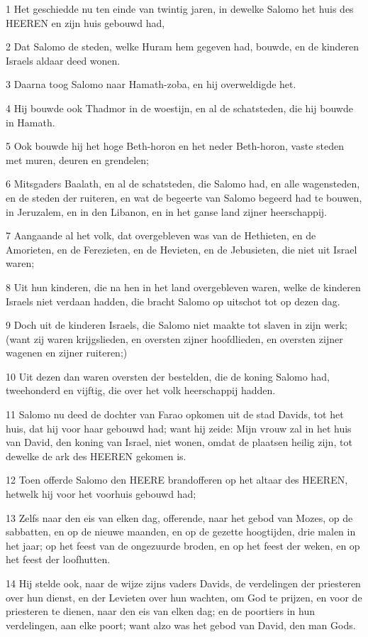 \par 1 Het geschiedde nu ten einde van twintig jaren, in dewelke Salomo het huis des HEEREN en zijn huis gebouwd had,
\par 2 Dat Salomo de steden, welke Huram hem gegeven had, bouwde, en de kinderen Israels aldaar deed wonen.
\par 3 Daarna toog Salomo naar Hamath-zoba, en hij overweldigde het.
\par 4 Hij bouwde ook Thadmor in de woestijn, en al de schatsteden, die hij bouwde in Hamath.
\par 5 Ook bouwde hij het hoge Beth-horon en het neder Beth-horon, vaste steden met muren, deuren en grendelen;
\par 6 Mitsgaders Baalath, en al de schatsteden, die Salomo had, en alle wagensteden, en de steden der ruiteren, en wat de begeerte van Salomo begeerd had te bouwen, in Jeruzalem, en in den Libanon, en in het ganse land zijner heerschappij.
\par 7 Aangaande al het volk, dat overgebleven was van de Hethieten, en de Amorieten, en de Ferezieten, en de Hevieten, en de Jebusieten, die niet uit Israel waren;
\par 8 Uit hun kinderen, die na hen in het land overgebleven waren, welke de kinderen Israels niet verdaan hadden, die bracht Salomo op uitschot tot op dezen dag.
\par 9 Doch uit de kinderen Israels, die Salomo niet maakte tot slaven in zijn werk; (want zij waren krijgslieden, en oversten zijner hoofdlieden, en oversten zijner wagenen en zijner ruiteren;)
\par 10 Uit dezen dan waren oversten der bestelden, die de koning Salomo had, tweehonderd en vijftig, die over het volk heerschappij hadden.
\par 11 Salomo nu deed de dochter van Farao opkomen uit de stad Davids, tot het huis, dat hij voor haar gebouwd had; want hij zeide: Mijn vrouw zal in het huis van David, den koning van Israel, niet wonen, omdat de plaatsen heilig zijn, tot dewelke de ark des HEEREN gekomen is.
\par 12 Toen offerde Salomo den HEERE brandofferen op het altaar des HEEREN, hetwelk hij voor het voorhuis gebouwd had;
\par 13 Zelfs naar den eis van elken dag, offerende, naar het gebod van Mozes, op de sabbatten, en op de nieuwe maanden, en op de gezette hoogtijden, drie malen in het jaar; op het feest van de ongezuurde broden, en op het feest der weken, en op het feest der loofhutten.
\par 14 Hij stelde ook, naar de wijze zijns vaders Davids, de verdelingen der priesteren over hun dienst, en der Levieten over hun wachten, om God te prijzen, en voor de priesteren te dienen, naar den eis van elken dag; en de poortiers in hun verdelingen, aan elke poort; want alzo was het gebod van David, den man Gods.
